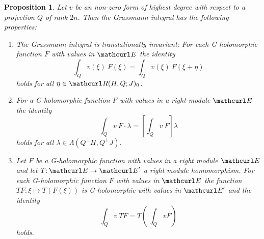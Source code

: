 \documentclass[pra,twoside,amsmath,amsfonts,amssymb,superscriptaddress,showpacs]{revtex4}
\newtheorem{prop}[thm]{Proposition}
\def\9#1{{\mathcurl #1}}
\newcommand{\GR}[2]{\Lambda(#1,#2)}
\newcommand{\PHSP}[3]{\9R(#1,#3;#2)}
\begin{document}
\begin{prop}
\label{prop:GrInt}
Let $v$ be an non-zero form of highest degree with respect to a projection $Q$ of rank
$2n$. Then the Grassmann integral has the following properties:

\begin{enumerate}

\item 
The Grassmann integral is translationally invariant: For each G-holomorphic function $F$ with values
in $\9E$ the identity 
\begin{equation}
\int_Q v(\xi) \ F(\xi)= \int_Q {v}(\xi) \ F(\xi+\eta) 
\end{equation}
holds for all $\eta\in \PHSP{H}{J}{Q}_0$.

\item
For a G-holomorphic function $F$ with values in a right module $\9E$ the
identity 
\begin{equation}
\int_Q v \ F\cdot \lambda = \left[\int_Q {v} \ F \right]\lambda 
\end{equation}
holds for all $\lambda\in \GR{Q^\perp H}{Q^\perp J}$.

\item
Let $F$ be a G-holomorphic function with values in a right module $\9E$ and let
$T\mathpunct:\9E\to\9E'$ a right module homomorphism. For
each G-holomorphic function $F$ with values in $\9E$ the function $TF\mathpunct:\xi\mapsto
T(F(\xi))$ is G-holomorphic with values in $\9E'$ and the identity 
\begin{equation}
\int_Q v \ TF = T\left( \ \int_Q v F \right)
\end{equation}
holds. 

\end{enumerate}
\end{prop}
\end{document}
